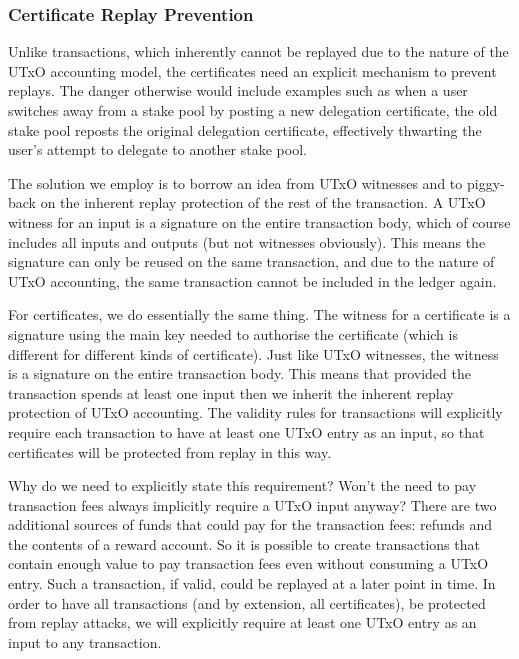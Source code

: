 \documentclass[11pt,a4paper]{article}
\begin{document}
\subsubsection{Certificate Replay Prevention}
\label{certificate-replay-prevention}

Unlike transactions, which inherently cannot be replayed due to the nature of
the UTxO accounting model, the certificates need an explicit mechanism to
prevent replays. The danger otherwise would include examples such as when a user
switches away from a stake pool by posting a new delegation certificate, the old
stake pool reposts the original delegation certificate, effectively thwarting
the user's attempt to delegate to another stake pool.

The solution we employ is to borrow an idea from UTxO witnesses and to
piggy-back on the inherent replay protection of the rest of the
transaction. A UTxO witness for an input is a signature on the entire
transaction body, which of course includes all inputs and outputs (but
not witnesses obviously). This means the signature can only be reused
on the same transaction, and due to the nature of UTxO accounting, the
same transaction cannot be included in the ledger again.

For certificates, we do essentially the same thing. The witness for a
certificate is a signature using the main key needed to authorise the
certificate (which is different for different kinds of certificate).
Just like UTxO witnesses, the witness is a signature on the entire
transaction body. This means that provided the transaction spends at
least one input then we inherit the inherent replay protection of UTxO
accounting. The validity rules for transactions will explicitly require each
transaction to have at least one UTxO entry as an input, so that certificates
will be protected from replay in this way.

Why do we need to explicitly state this requirement? Won't the need to pay
transaction fees always implicitly require a UTxO input anyway? There are two
additional sources of funds that could pay for the transaction fees: refunds and
the contents of a reward account. So it is possible to create transactions that
contain enough value to pay transaction fees even without consuming a UTxO
entry. Such a transaction, if valid, could be replayed at a later point in time.
In order to have all transactions (and by extension, all certificates), be
protected from replay attacks, we will explicitly require at least one UTxO
entry as an input to any transaction.
\end{document}
